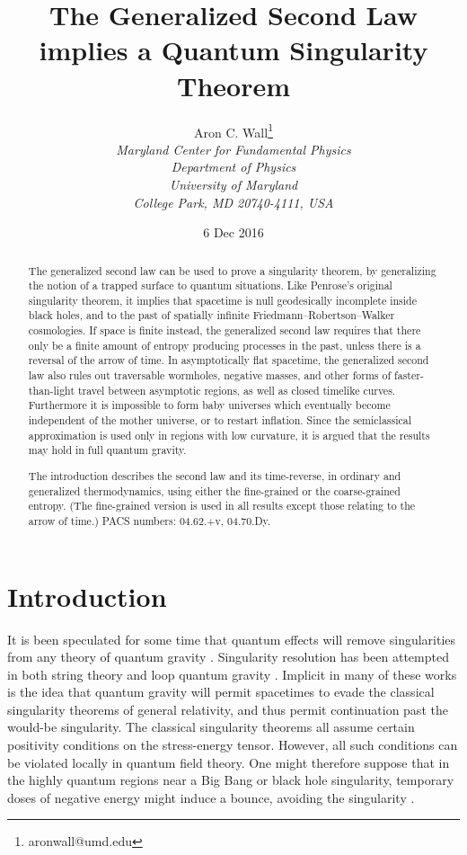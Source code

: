\documentclass[12pt]{article}
\author{Aron C. Wall\footnote{aronwall@umd.edu}
\\ \textit{Maryland Center for Fundamental Physics} \\ \textit{Department of Physics} \\ \textit{University of Maryland} \\ \textit{College Park, MD 20740-4111, USA} }
\title{The Generalized Second Law implies a Quantum Singularity Theorem}
\date{6 Dec 2016}
\begin{document}
\maketitle

\begin{abstract}

The generalized second law can be used to prove a singularity theorem, by generalizing the notion of a trapped surface to quantum situations.  Like Penrose's original singularity theorem, it implies that spacetime is null geodesically incomplete inside black holes, and to the past of spatially infinite Friedmann--Robertson--Walker cosmologies.  If space is finite instead, the generalized second law requires that there only be a finite amount of entropy producing processes in the past, unless there is a reversal of the arrow of time.  In asymptotically flat spacetime, the generalized second law also rules out traversable wormholes, negative masses, and other forms of faster-than-light travel between asymptotic regions, as well as closed timelike curves.  Furthermore it is impossible to form baby universes which eventually become independent of the mother universe, or to restart inflation.  Since the semiclassical approximation is used only in regions with low curvature, it is argued that the results may hold in full quantum gravity.

The introduction describes the second law and its time-reverse, in ordinary and generalized thermodynamics, using either the fine-grained or the coarse-grained entropy.  (The fine-grained version is used in all results except those relating to the arrow of time.)
\newline\newline
PACS numbers: 04.62.+v, 04.70.Dy.
\end{abstract}

\newpage

\tableofcontents

\section{Introduction}\label{intro}

It is been speculated for some time that quantum effects will remove singularities from any theory of quantum gravity \cite{SingRes}.  Singularity resolution has been attempted in both string theory \cite{stringy} and loop quantum gravity \cite{loopy}.  Implicit in many of these works is the idea that quantum gravity will permit spacetimes to evade the classical singularity theorems of general relativity, and thus permit continuation past the would-be singularity.  The classical singularity theorems all assume certain positivity conditions on the stress-energy tensor.  However, all such conditions can be violated locally in quantum field theory.  One might therefore suppose that in the highly quantum regions near a Big Bang or black hole singularity, temporary doses of negative energy might induce a bounce, avoiding the singularity \cite{bounce}.
\end{document}
